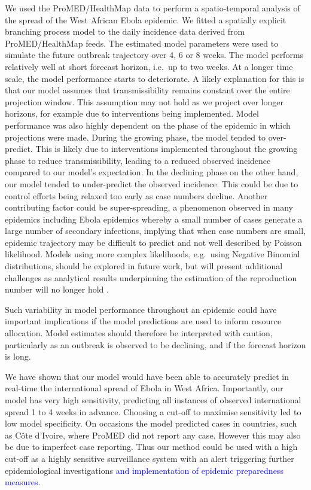 \documentclass[9pt,twocolumn,twoside,lineno]{pnas-new}
\newcommand{\sangeeta}[1]{\textcolor{blue}{#1}}
\begin{document}
We used the ProMED/HealthMap data to perform a spatio-temporal analysis
of the spread of the West African Ebola epidemic. We fitted a spatially
explicit branching process model to the daily incidence data derived
from ProMED/HealthMap feeds. The estimated model parameters were used to
simulate the future outbreak trajectory over 4, 6 or 8 weeks. The model
performs relatively well at short forecast horizon, i.e.~up to
two weeks. At a
longer time scale, the model performance starts to deteriorate. A likely
explanation for this is that our model assumes that transmissibility
remains constant over the entire projection window. This assumption may
not hold as we project over longer horizons, for example due to
interventions being implemented. Model performance was also highly
dependent on the phase of the epidemic in which projections were made.
During the growing phase, the model tended to over-predict. This is
likely due to interventions implemented throughout the growing phase to
reduce transmissibility, leading to a reduced observed incidence
compared to our model's expectation. In the declining phase on the other
hand, our model tended to under-predict the observed incidence. This
could be due to control efforts being relaxed too early as case
numbers decline. Another contributing factor could be super-spreading,
a phenomenon observed in many
epidemics including Ebola epidemics \cite{lau2017spatial,
  agua2016exposure}
whereby a small number of cases generate a large
number of secondary infections, implying that when case numbers are
small, epidemic trajectory may be difficult to predict and not well
described by Poisson likelihood. Models using more complex likelihoods,
e.g.~using Negative Binomial distributions, should be explored in future
work, but will present additional challenges as analytical results
underpinning the estimation of the reproduction number will no longer
hold \cite{cori2013new}.

Such variability in model performance throughout an epidemic could have
important implications if the model predictions are used to inform
resource allocation. Model estimates should therefore be interpreted
with caution, particularly as an outbreak is observed to be declining,
and if the forecast horizon is long.

We have shown that our model would have been
able to accurately predict in real-time the international spread of
Ebola in West Africa. Importantly, our
model has very high sensitivity, predicting all instances of observed
international spread 1 to 4 weeks in advance. Choosing a cut-off to
maximise sensitivity led to low model specificity. On occasions the
model predicted cases in countries, such as Côte d'Ivoire, where
ProMED did not report any case.
However this may also be due to imperfect case reporting. Thus our
method could be used with a high cut-off as a highly sensitive
surveillance system with an alert triggering further epidemiological
investigations \sangeeta{and implementation of epidemic preparedness measures}. 
\end{document}
